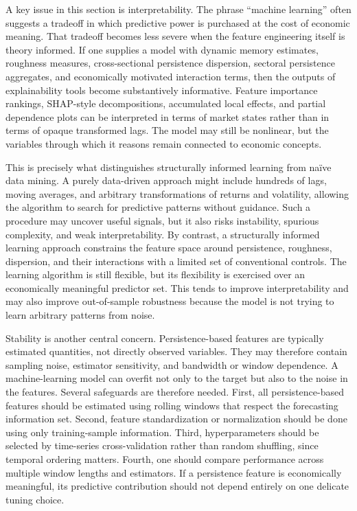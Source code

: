 \documentclass[12pt]{article}
\begin{document}
A key issue in this section is interpretability. The phrase ``machine learning'' often suggests a tradeoff in which predictive power is purchased at the cost of economic meaning. That tradeoff becomes less severe when the feature engineering itself is theory informed. If one supplies a model with dynamic memory estimates, roughness measures, cross-sectional persistence dispersion, sectoral persistence aggregates, and economically motivated interaction terms, then the outputs of explainability tools become substantively informative. Feature importance rankings, SHAP-style decompositions, accumulated local effects, and partial dependence plots can be interpreted in terms of market states rather than in terms of opaque transformed lags. The model may still be nonlinear, but the variables through which it reasons remain connected to economic concepts.

This is precisely what distinguishes structurally informed learning from na\"{i}ve data mining. A purely data-driven approach might include hundreds of lags, moving averages, and arbitrary transformations of returns and volatility, allowing the algorithm to search for predictive patterns without guidance. Such a procedure may uncover useful signals, but it also risks instability, spurious complexity, and weak interpretability. By contrast, a structurally informed learning approach constrains the feature space around persistence, roughness, dispersion, and their interactions with a limited set of conventional controls. The learning algorithm is still flexible, but its flexibility is exercised over an economically meaningful predictor set. This tends to improve interpretability and may also improve out-of-sample robustness because the model is not trying to learn arbitrary patterns from noise.

Stability is another central concern. Persistence-based features are typically estimated quantities, not directly observed variables. They may therefore contain sampling noise, estimator sensitivity, and bandwidth or window dependence. A machine-learning model can overfit not only to the target but also to the noise in the features. Several safeguards are therefore needed. First, all persistence-based features should be estimated using rolling windows that respect the forecasting information set. Second, feature standardization or normalization should be done using only training-sample information. Third, hyperparameters should be selected by time-series cross-validation rather than random shuffling, since temporal ordering matters. Fourth, one should compare performance across multiple window lengths and estimators. If a persistence feature is economically meaningful, its predictive contribution should not depend entirely on one delicate tuning choice.
\end{document}
